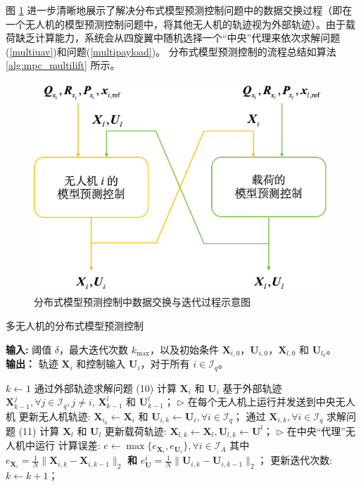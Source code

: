 \documentclass[lang=chs, degree=master, blindreview=true, winfonts=true]{yanputhesis}
\begin{document}
图 \ref{4_2} 进一步清晰地展示了解决分布式模型预测控制问题中的数据交换过程（即在一个无人机的模型预测控制问题中，将其他无人机的轨迹视为外部轨迹）。由于载荷缺乏计算能力，系统会从四旋翼中随机选择一个“中央”代理来依次求解问题(\ref{multiuav})和问题(\ref{multipayload})。
分布式模型预测控制的流程总结如算法 \ref{alg:mpc_multilift} 所示。

\begin{figure}[hbt!]
	\centering
	\includegraphics[width=26pc]{picture/4_2.png} 
	\caption{分布式模型预测控制中数据交换与迭代过程示意图
	} 
	\label{4_2}
\end{figure}

\begin{algorithm}[h]
	\caption{多无人机的分布式模型预测控制}
	\label{alg:mpc_multilift}
	\textbf{输入:} 阈值 $\delta$，最大迭代次数 $k_{\text{max}}$，以及初始条件 $\bm{X}_{i,0}$，$\bm{U}_{i,0}$，$\bm{X}_{l,0}$ 和 $\bm{U}_{l_0}$。\\
	\textbf{输出：} 轨迹 $\bm{X}_i$ 和控制输入 $\bm{U}_i$，对于所有 $i \in \mathcal{I}_q$。
	
	\begin{algorithmic}[1]
	\State $k \gets 1$
			\State 通过外部轨迹求解问题 (10) 计算 $\bm{X}_i$ 和 $\bm{U}_i$
			\Statex \quad 基于外部轨迹 $\bm{X}^j_{k-1}, \forall j \in \mathcal{I}_q, j \neq i$, $\bm{X}^l_{k-1}$ 和 $\bm{U}^l_{k-1}$；
			\Statex \quad $\triangleright$ 在每个无人机上运行并发送到中央无人机
		\EndFor
		\State 更新无人机轨迹: $\bm{X}_{i_k} \gets \bm{X}_i$ 和 $\bm{U}_{i,k} \gets \bm{U}_i, \forall i \in \mathcal{I}_q$；
		\State 通过 $\bm{X}_{i,k}, \forall i \in \mathcal{I}_q$ 求解问题 (11) 计算 $\bm{X}_l$ 和 $\bm{U}_l$
		\State 更新载荷轨迹: $\bm{X}_{l,k} \gets \bm{X}_l, \bm{U}_{l,k} \gets \bm{U}^l$；
		\Statex \quad $\triangleright$ 在中央“代理”无人机中运行
		\State 计算误差: $e \gets \max \{ e_{\bm{X}_i}, e_{\bm{U}_i} \}, \forall i \in \mathcal{I}_A$ 
		\Statex \quad 其中 $e_{\bm{X}_i} = \frac{1}{N} \| \bm{X}_{i,k} - \bm{X}_{i,{k-1}} \|_2$ \textbf{和} 
		\Statex \quad $e^i_{\bm{U}} = \frac{1}{N} \| \bm{U}_{i,k} - \bm{U}_{i,{k-1}} \|_2$；
		\State 更新迭代次数: $k \gets k + 1$；
	\EndWhile
	\end{algorithmic}
\end{algorithm}
\end{document}
